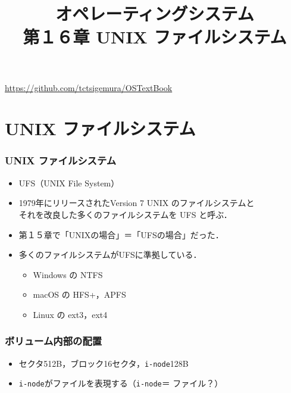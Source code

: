 \documentclass[unicode]{beamer}                   %
\newcommand{\inode}{\texttt{i-node}}
\begin{document}
\title[UNIX ファイルシステム]
      {オペレーティングシステム\\第１６章 UNIX ファイルシステム}
\date{}
\begin{frame}
  \titlepage
  \centerline{\url{https://github.com/tctsigemura/OSTextBook}}
\end{frame}


\section{UNIX ファイルシステム}
\begin{frame}
  \frametitle{UNIX ファイルシステム}
  \begin{itemize}
  \item UFS（UNIX File System）
  \item 1979年にリリースされたVersion 7 UNIX のファイルシステムと \\
    それを改良した多くのファイルシステムを UFS と呼ぶ．
  \item 第１５章で「UNIXの場合」＝「UFSの場合」だった．
  \item 多くのファイルシステムがUFSに準拠している．
    \begin{itemize}
    \item Windows の NTFS
    \item macOS の HFS+，APFS
    \item Linux の ext3，ext4
    \end{itemize}
  \end{itemize}
  \vfill
\end{frame}

\begin{frame}
  \frametitle{ボリューム内部の配置}
  \begin{itemize}
  \item セクタ512B，ブロック16セクタ，\inode 128B
  \item \inode がファイルを表現する（\inode ＝ ファイル？）
  \end{itemize}
  \vfill
\end{frame}
\end{document}
